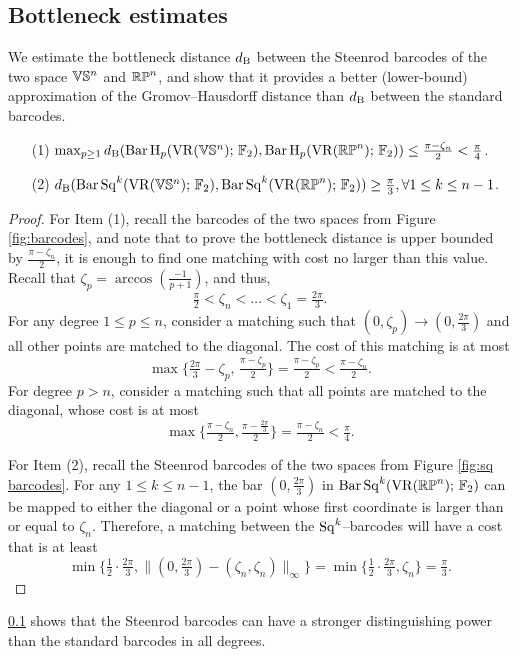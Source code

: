 \subsection{Bottleneck estimates}\label{prop:db estimate}

We estimate the bottleneck distance $d_{\mathrm{B}}$ between the Steenrod barcodes of the two space $\mathbb{V}\mathbb{S}^n$ and $\mathbb{RP}^n$, and show that it provides a better (lower-bound) approximation of the Gromov--Hausdorff distance than $d_{\mathrm{B}}$ between the standard barcodes.

\medskip\theorem
\begin{itemize}
	\item[(1)] $\max_{p\geq 1}d_{\mathrm{B}}(\operatorname{Bar} \operatorname{H}_{p}(\operatorname{VR}(\mathbb{V}\mathbb{S}^n);\,{\mathbb{F}_2}), \operatorname{Bar} \operatorname{H}_{p}(\operatorname{VR}(\mathbb{RP}^n);\,{\mathbb{F}_2}))\leq \tfrac{\pi-\zeta_n}{2} < \tfrac{\pi}{4}$.
	\smallskip\item[(2)] $d_{\mathrm{B}}(\operatorname{Bar}\operatorname{Sq}^{k}(\operatorname{VR}(\mathbb{V}\mathbb{S}^n);\,{\mathbb{F}_2}), \operatorname{Bar}\operatorname{Sq}^{k}(\operatorname{VR}(\mathbb{RP}^n);\,{\mathbb{F}_2}))\geq \tfrac{\pi}{3},\forall 1\leq k\leq n-1$.
\end{itemize}

\begin{proof}
	For Item (1), recall the barcodes of the two spaces from Figure \ref{fig:barcodes}, and note that to prove the bottleneck distance is upper bounded by $\tfrac{\pi-\zeta_n}{2}$, it is enough to find one matching with cost no larger than this value.
	Recall that $\zeta_p = \arccos(\tfrac{-1}{p+1})$, and thus,
	\[
	\tfrac{\pi}{2} < \zeta_n < \dots < \zeta_1 = \tfrac{2\pi}{3}.
	\]
	For any degree $1\leq p\leq n$, consider a matching such that $(0,\zeta_p)\rightarrow (0,\tfrac{2\pi}{3})$ and all other points are matched to the diagonal.
	The cost of this matching is at most
	\[
	\max\{\tfrac{2\pi}{3}-\zeta_p,\,\tfrac{\pi-\zeta_p}{2} \} = \tfrac{\pi-\zeta_p}{2} < \tfrac{\pi-\zeta_n}{2}.
	\]
	For degree $p>n$, consider a matching such that all points are matched to the diagonal, whose cost is at most
	\[
	\max\{\tfrac{\pi-\zeta_n}{2}, \tfrac{\pi-\tfrac{2\pi}{3}}{2} \} = \tfrac{\pi-\zeta_n}{2} < \tfrac{\pi}{4}.
	\]
	
	For Item (2), recall the Steenrod barcodes of the two spaces from Figure \ref{fig:sq barcodes}.
	For any $1\leq k\leq n-1$, the bar $(0,\tfrac{2\pi}{3})$ in $\operatorname{Bar}\operatorname{Sq}^{k}(\operatorname{VR}(\mathbb{RP}^n);\,{\mathbb{F}_2})$ can be mapped to either the diagonal or a point whose first coordinate is larger than or equal to $\zeta_n$.
	Therefore, a matching between the $\operatorname{Sq}^k$--barcodes will have a cost that is at least 
        \[\min\{\tfrac{1}{2}\cdot\tfrac{2\pi}{3}, \|(0, \tfrac{2\pi}{3}) - (\zeta_n, \zeta_n)\|_{\infty}\} = \min\{\tfrac{1}{2}\cdot\tfrac{2\pi}{3}, \zeta_n\} = \tfrac{\pi}{3}.\]
\end{proof}

\cref{prop:db estimate} shows that the Steenrod barcodes can have a stronger distinguishing power than the standard barcodes in all degrees.
